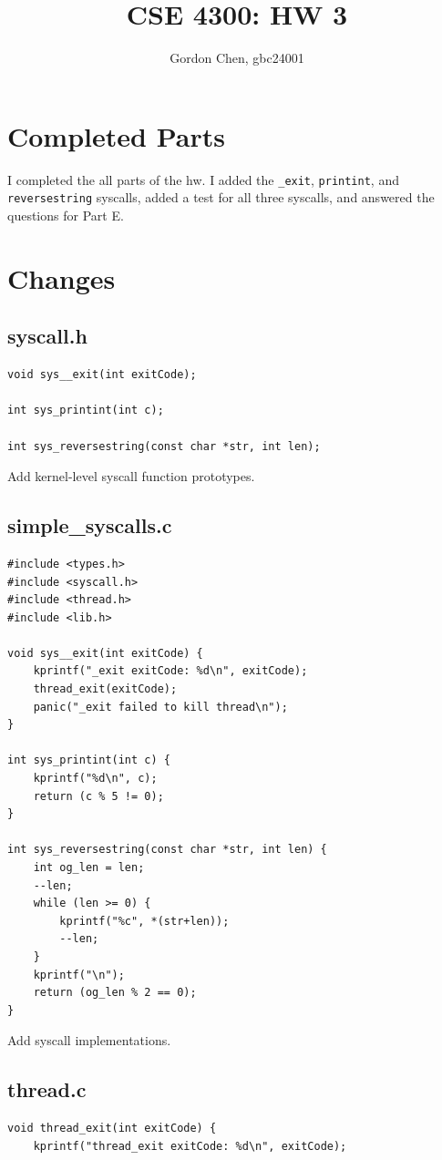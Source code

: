 \documentclass[10pt]{article}
\title{CSE 4300: HW 3}
\author{Gordon Chen, gbc24001}
\date{}
\begin{document}
\maketitle


\section*{Completed Parts}
I completed the all parts of the hw. I added the \verb|_exit|, \verb|printint|, and \verb|reversestring|
syscalls, added a test for all three syscalls, and answered the questions for Part E.



\section*{Changes}
\subsection*{syscall.h}
\begin{verbatim}
void sys__exit(int exitCode);

int sys_printint(int c);

int sys_reversestring(const char *str, int len);
\end{verbatim}

Add kernel-level syscall function prototypes.


\subsection*{simple\_syscalls.c}
\begin{verbatim}
#include <types.h>
#include <syscall.h>
#include <thread.h>
#include <lib.h>

void sys__exit(int exitCode) {
    kprintf("_exit exitCode: %d\n", exitCode);
    thread_exit(exitCode);
    panic("_exit failed to kill thread\n");
}

int sys_printint(int c) {
    kprintf("%d\n", c);
    return (c % 5 != 0);
}

int sys_reversestring(const char *str, int len) {
    int og_len = len;
    --len;
    while (len >= 0) {
        kprintf("%c", *(str+len));
        --len;
    }
    kprintf("\n");
    return (og_len % 2 == 0);
}
\end{verbatim}

Add syscall implementations.


\subsection*{thread.c}
\begin{verbatim}
void thread_exit(int exitCode) {
    kprintf("thread_exit exitCode: %d\n", exitCode);
\end{verbatim}
\end{document}
